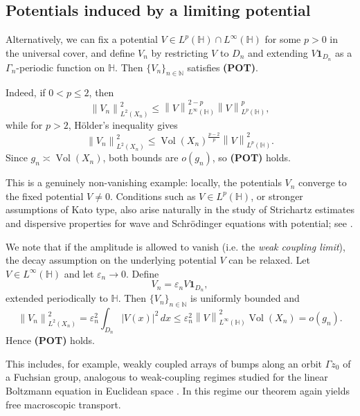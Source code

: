 \documentclass[11pt,twoside,reqno]{amsart}
\newcommand{\N}{\mathbb{N}}
\newcommand{\1}{\mathrm{\mathbf{1}}}
\DeclareMathOperator{\Vol}{Vol}
\newcommand{\norm}[1]{\left\lVert#1\right\rVert}
\numberwithin{equation}{section}
\theoremstyle{plain}
\theoremstyle{definition}
\theoremstyle{remark}
\begin{document}
\subsection{Potentials induced by a limiting potential}
\label{ex:potential}

Alternatively, we can fix a potential $V\in L^p(\mathbb H)\cap L^\infty(\mathbb H)$ for some $p>0$ in the universal cover, and define
$V_n$ by restricting $V$ to $D_n$ and extending $V\boldsymbol{1}_{D_n}$ as a
$\Gamma_n$-periodic function on $\mathbb H$. Then $\{V_n\}_{n\in\N}$ satisfies
\textbf{(POT)}.

Indeed, if $0<p\leq2$, then
\[
    \norm{V_n}_{L^2(X_n)}^2
    \leq
    \norm{V}_{L^\infty(\mathbb H)}^{2-p}
    \norm{V}_{L^p(\mathbb H)}^p,
\]
while for $p>2$, H\"older's inequality gives
\[
    \norm{V_n}_{L^2(X_n)}^2
    \leq
    \Vol(X_n)^{\frac{p-2}{p}}
    \norm{V}_{L^p(\mathbb H)}^2.
\]
Since $g_n\asymp\Vol(X_n)$, both bounds are $o(g_n)$, so \textbf{(POT)} holds.

This is a genuinely non-vanishing example: locally, the potentials $V_n$
converge to the fixed potential $V\neq0$. Conditions such as
$V\in L^p(\mathbb H)$, or stronger assumptions of Kato type, also arise
naturally in the study of Strichartz estimates and dispersive properties for
wave and Schr\"odinger equations with potential; see
\cite{Journe1991Decay,ErdoganGoldbergSchlag2008,goldberg2009strichartz,
beceanu2025dispersiveestimatesschrodingerswave,Chen2018,
AnkerPierfelice2009,AnkerPierfelice2014,AnPiVa1,AnPiVa2,
RodnianskiSchlag2004,Ionescu2000,hassani2011wave}.

We note that if the amplitude is allowed to vanish (i.e. the \textit{weak coupling limit}), the decay assumption on the underlying
potential $V$ can be relaxed. Let $V\in L^\infty(\mathbb H)$ and let
$\varepsilon_n\to0$. Define
\[
    V_n
    =
    \varepsilon_n V\boldsymbol{1}_{D_n},
\]
extended periodically to $\mathbb H$. Then $\{V_n\}_{n\in\N}$ is uniformly bounded and
\[
    \norm{V_n}_{L^2(X_n)}^2
    =
    \varepsilon_n^2
    \int_{D_n}|V(x)|^2\,dx
    \leq
    \varepsilon_n^2
    \norm{V}_{L^\infty(\mathbb H)}^2
    \Vol(X_n)
    =
    o(g_n).
\]
Hence \textbf{(POT)} holds.

This includes, for example, weakly coupled arrays of bumps along an orbit
$\Gamma z_0$ of a Fuchsian group, analogous to weak-coupling regimes studied
for the linear Boltzmann equation in Euclidean space
\cite{BreteauxlinearBoltzmann2014,LinearBoltzmannErdosYau2000}.
In this regime our theorem again yields free macroscopic transport.
\end{document}
